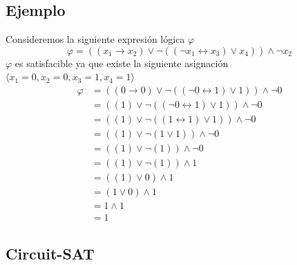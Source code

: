 \documentclass[a4paper]{article}
\begin{document}
\subsection{Ejemplo}
\noindent
Consideremos la siguiente expresión lógica \(\varphi\)
\[
    \varphi = \left(\left(x_{1} \longrightarrow x_{2}\right) \lor \neg\left(\left(\neg x_{1} \longleftrightarrow x_{3}\right) \lor x_{4}\right)\right) \land \neg x_{2}
\]  
\(\varphi\) es satisfacible ya que existe la siguiente asignación \(\langle x_{1} = 0, x_{2} = 0, x_{3} = 1, x_{4} = 1 \rangle\)
\begin{align*}
    \varphi &= \left(\left(0 \longrightarrow 0\right) \lor \neg\left(\left(\neg 0 \longleftrightarrow 1\right) \lor 1\right)\right) \land \neg 0 \\
            &= \left(\left(1\right) \lor \neg\left(\left(\neg 0 \longleftrightarrow 1\right) \lor 1\right)\right) \land \neg 0 \\
            &= \left(\left(1\right) \lor \neg\left(\left(1 \longleftrightarrow 1\right) \lor 1\right)\right) \land \neg 0 \\
            &= \left(\left(1\right) \lor \neg\left(1 \lor 1\right)\right) \land \neg 0 \\
            &= \left(\left(1\right) \lor \neg\left(1\right)\right) \land \neg 0 \\
            &= \left(\left(1\right) \lor \neg\left(1\right)\right) \land 1 \\
            &= \left(\left(1\right) \lor 0 \right) \land 1 \\
            &= \left(1 \lor 0 \right) \land 1 \\
            &= 1 \land 1 \\
            &= 1
\end{align*}
\newpage
\subsection{Circuit-SAT}
\end{document}
